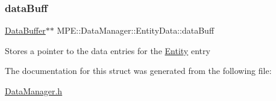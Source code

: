 \subsubsection{\texorpdfstring{data\+Buff}{dataBuff}}
{\footnotesize\ttfamily \hyperlink{struct_m_p_e_1_1_data_manager_1_1_data_buffer}{Data\+Buffer}$\ast$$\ast$ M\+P\+E\+::\+Data\+Manager\+::\+Entity\+Data\+::data\+Buff}

Stores a pointer to the data entries for the \hyperlink{struct_m_p_e_1_1_entity}{Entity} entry 

The documentation for this struct was generated from the following file\+:\begin{DoxyCompactItemize}
\item 
\hyperlink{_data_manager_8h}{Data\+Manager.\+h}\end{DoxyCompactItemize}
